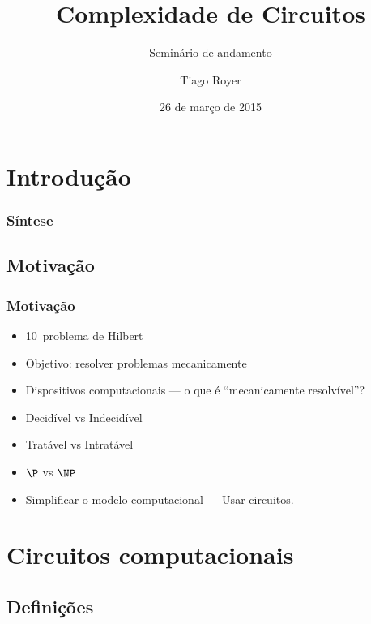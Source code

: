 \documentclass[utf8,notheorems]{beamer}
\theoremstyle{definition}
\begin{document}
\author{Tiago Royer}
\title{Complexidade de Circuitos}
\subtitle{Seminário de andamento}
\date{26 de março de 2015}
\begin{frame}
    \titlepage
\end{frame}

\section{Introdução}

\begin{frame}
    \frametitle{Síntese}
    \tableofcontents
\end{frame}

\subsection{Motivação}

\begin{frame}
    \frametitle{Motivação}
    \begin{itemize}
        \item 10\textordmasculine\ problema de Hilbert
        \item Objetivo: resolver problemas mecanicamente
        \pause
        \item Dispositivos computacionais
            --- o que é ``mecanicamente resolvível''?
        \item Decidível vs Indecidível
        \pause
        \item Tratável vs Intratável
        \pause
        \item $\P$ vs $\NP$
        \pause
        \item Simplificar o modelo computacional
            --- Usar circuitos.
    \end{itemize}
\end{frame}

\section{Circuitos computacionais}

\subsection{Definições}

\newcommand{\placenode}[1]{
    \node (x#1) at (2*#1, 0) {$x_#1$};
    \path (2*#1+0.5, 1) node[draw,circle] (neg#1) {$\neg$};
    \coordinate (p#1) at (2*#1 - 0.5, 2);
    \coordinate (n#1) at (2*#1 + 0.5, 2);
    \draw (x#1) -- (2*#1 - 0.5, 1) -- (p#1) -- (wp);
    \draw (x#1) -- (neg#1) -- (n#1) -- (wn);
}
\end{document}
